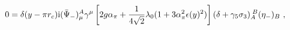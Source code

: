 \begin{equation} \label{rownanienaznikaniebaggerflip}
    0=\delta(y-\pi r_c){\rm i}(\bar{\Psi}_{-})_\mu^A\gamma^\mu\left[2g\alpha_{\pi}+\frac{1}{4\sqrt{2}}\lambda_0(1+3\alpha^{2}_{\pi}\epsilon(y)^{2})\right](\delta+\gamma_5\sigma_{3})_{A}^{\;B}(\eta_-)_B\ ,
  \end{equation} 
